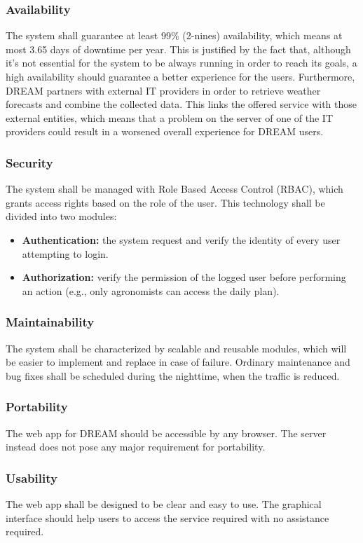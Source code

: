\subsubsection{Availability}
The system shall guarantee at least 99\% (2-nines) availability, which means at most 3.65 days of downtime per year. This is justified by the fact that, although it’s not essential for the system to be always running in order to reach its goals, a high availability should guarantee a better experience for the users.
Furthermore, DREAM partners with external IT providers in order to retrieve weather forecasts and combine the collected data. This links the offered service with those external entities, which means that a problem on the server of one of the IT providers could result in a worsened overall experience for DREAM users.
\subsubsection{Security}
The system shall be managed with Role Based Access Control (RBAC), which grants access rights based on the role of the user. This technology shall be divided into two modules:
\begin{itemize}
    \item \textbf{Authentication:} the system request and verify the identity of every user attempting to login.
    \item \textbf{Authorization:} verify the permission of the logged user before performing an action (e.g., only agronomists can access the daily plan).
\end{itemize}
\subsubsection{Maintainability}
The system shall be characterized by scalable and reusable modules, which will be easier to implement and replace in case of failure. Ordinary maintenance and bug fixes shall be scheduled during the nighttime, when the traffic is reduced.
\subsubsection{Portability}
The web app for DREAM should be accessible by any browser. The server instead does not pose any major requirement for portability.
\subsubsection{Usability}
The web app shall be designed to be clear and easy to use. The graphical interface should help users to access the service required with no assistance required. 
